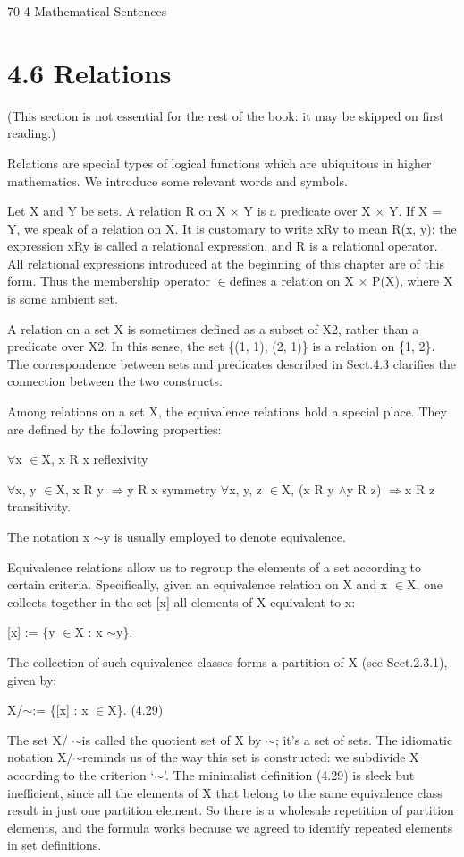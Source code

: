 \documentclass[11pt]{article}
\theoremstyle{plain}
\theoremstyle{definition}
\begin{document}
70 4 Mathematical Sentences

\section{4.6 Relations}

(This section is not essential for the rest of the book: it may be skipped on first reading.)

Relations are special types of logical functions which are ubiquitous in higher mathematics. We introduce some relevant words and symbols.

Let X and Y be sets. A relation R on X $\times$ Y is a predicate over X $\times$ Y. If X = Y, we speak of a relation on X. It is customary to write xRy to mean R(x, y); the expression xRy is called a relational expression, and R is a relational operator. All relational expressions introduced at the beginning of this chapter are of this form. Thus the membership operator $\in$defines a relation on X $\times$ P(X), where X is some ambient set.

A relation on a set X is sometimes defined as a subset of X2, rather than a predicate over X2. In this sense, the set \{(1, 1), (2, 1)\} is a relation on \{1, 2\}. The correspondence between sets and predicates described in Sect.4.3 clarifies the connection between the two constructs.

Among relations on a set X, the equivalence relations hold a special place. They are defined by the following properties:

$\forall$x $\in$X, x R x reflexivity

$\forall$x, y $\in$X, x R y $\Rightarrow$y R x symmetry $\forall$x, y, z $\in$X, (x R y $\land$y R z) $\Rightarrow$x R z transitivity.

The notation x $\sim$y is usually employed to denote equivalence.

Equivalence relations allow us to regroup the elements of a set according to certain criteria. Specifically, given an equivalence relation on X and x $\in$X, one collects together in the set [x] all elements of X equivalent to x:

[x] := \{y $\in$X : x $\sim$y\}.

The collection of such equivalence classes forms a partition of X (see Sect.2.3.1), given by:

X/$\sim$:= \{[x] : x $\in$X\}. (4.29)

The set X/ $\sim$is called the quotient set of X by $\sim$; it's a set of sets. The idiomatic notation X/$\sim$reminds us of the way this set is constructed: we subdivide X according to the criterion `$\sim$'. The minimalist definition (4.29) is sleek but inefficient, since all the elements of X that belong to the same equivalence class result in just one partition element. So there is a wholesale repetition of partition elements, and the formula works because we agreed to identify repeated elements in set definitions.
\end{document}
